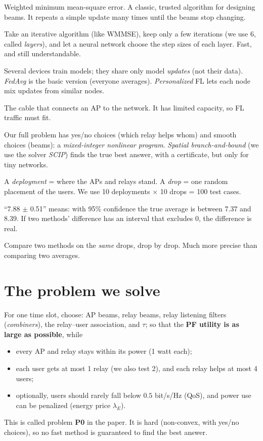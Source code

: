 \documentclass[11pt,a4paper]{article}
\begin{document}
\begin{description}[style=nextline,leftmargin=1.2em]
\item[WMMSE] Weighted minimum mean-square error. A classic, trusted algorithm for designing beams. It repeats a
  simple update many times until the beams stop changing.
\item[Deep unfolding] Take an iterative algorithm (like WMMSE), keep only a few iterations (we use 6, called
  \emph{layers}), and let a neural network choose the step sizes of each layer. Fast, and still understandable.
\item[Federated learning (FL)] Several devices train models; they share only model \emph{updates} (not their
  data). \emph{FedAvg} is the basic version (everyone averages). \emph{Personalized} FL lets each node mix updates
  from similar nodes.
\item[Fronthaul] The cable that connects an AP to the network. It has limited capacity, so FL traffic must fit.
\item[MINLP and branch-and-bound] Our full problem has yes/no choices (which relay helps whom) and smooth choices
  (beams): a \emph{mixed-integer nonlinear program}. \emph{Spatial branch-and-bound} (we use the solver
  \emph{SCIP}) finds the true best answer, with a certificate, but only for tiny networks.
\item[Drop and deployment] A \emph{deployment} = where the APs and relays stand. A \emph{drop} = one random
  placement of the users. We use 10 deployments $\times$ 10 drops = 100 test cases.
\item[95\% confidence interval ($\pm$)] ``7.88 $\pm$ 0.51'' means: with 95\% confidence the true average is
  between 7.37 and 8.39. If two methods' difference has an interval that excludes 0, the difference is real.
\item[Paired comparison] Compare two methods on the \emph{same} drops, drop by drop. Much more precise than
  comparing two averages.
\end{description}

\section{The problem we solve}

For one time slot, choose: AP beams, relay beams, relay listening filters (\emph{combiners}), the relay--user
association, and $\tau$; so that the \textbf{PF utility is as large as possible}, while
\begin{itemize}
  \item every AP and relay stays within its power (1 watt each);
  \item each user gets at most 1 relay (we also test 2), and each relay helps at most 4 users;
  \item optionally, users should rarely fall below $0.5$ bit/s/Hz (QoS), and power use can be penalized
    (energy price $\lambda_E$).
\end{itemize}
This is called problem \textbf{P0} in the paper. It is hard (non-convex, with yes/no choices), so no fast method
is guaranteed to find the best answer.
\end{document}
